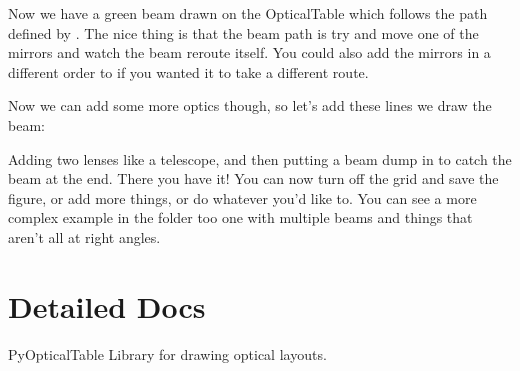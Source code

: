 \documentclass[letterpaper,10pt,english]{sphinxmanual}
\begin{document}
\sphinxAtStartPar
Now we have a green beam drawn on the OpticalTable  which follows the path defined by . The nice thing is that the beam path is  \sphinxhyphen{} try and move one of the mirrors and watch the beam re\sphinxhyphen{}route itself. You could also add the mirrors in a different order to  if you wanted it to take a different route.

\sphinxAtStartPar
Now we can add some more optics though, so let’s add these lines  we draw the beam:

\begin{sphinxVerbatim}[commandchars=\\\{\}]
     

     

      
\end{sphinxVerbatim}

\sphinxAtStartPar
Adding two lenses like a telescope, and then putting a beam dump in to catch the beam at the end. There you have it! You can now turn off the grid and save the figure, or add more things, or do whatever you’d like to. You can see a more complex example in the  folder too \sphinxhyphen{} one with multiple beams and things that aren’t all at right angles.

\noindent{}


\chapter{Detailed Docs}
\label{\detokenize{index:module-pyopticaltable}}\label{\detokenize{index:detailed-docs}}
\sphinxAtStartPar
PyOpticalTable \textendash{} Library for drawing optical layouts.
\end{document}
